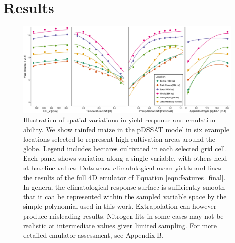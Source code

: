 \documentclass[gmd, manuscript]{copernicus} %
\begin{document}
\section{Results}
\label{S:3}

\begin{figure}[ht]
\centering
    \includegraphics[width=16cm]{figures/regression_areas.png}
    \caption{Illustration of spatial variations in yield response and emulation ability. 
    We show rainfed maize in the pDSSAT model in six example locations selected to represent high-cultivation areas around the globe. 
    Legend includes hectares cultivated in each selected grid cell. 
    Each panel shows variation along a single variable, with others held at baseline values. 
    Dots show climatological mean yields and lines the results of the full 4D emulator of Equation \ref{eqn:features_final}. 
    In general the climatological response surface is sufficiently smooth that it can be represented within the sampled variable space by the simple polynomial used in this work. 
    Extrapolation can however produce misleading results. 
    Nitrogen fits in some cases may not be realistic at intermediate values given limited sampling. 
    For more detailed emulator assessment, see Appendix B.}
   \label{fig:regression}
\end{figure}
\end{document}
